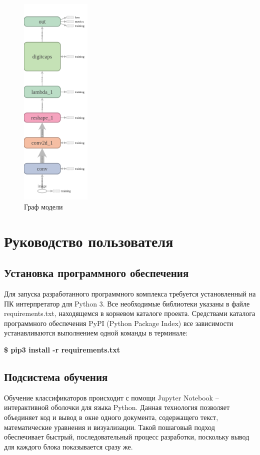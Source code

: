 \begin{figure}[!h]
	\centering
	\includegraphics[width=0.3\textwidth]{inc/img/graph}
	\caption{Граф модели}
	\label{impl:graph}
\end{figure}

\section{Руководство пользователя}

\subsection*{Установка программного обеспечения}

Для запуска разработанного программного комплекса требуется установленный на ПК интерпретатор для Python 3. Все необходимые библиотеки указаны в файле requirements.txt, находящемся в корневом каталоге проекта. Средствами каталога программного обеспечения PyPI (Python Package Index) все зависимости устанавливаются выполнением одной команды в терминале:

\textbf{\$ pip3 install -r requirements.txt}

\subsection*{Подсистема обучения}

Обучение классификаторов происходит с помощи Jupyter Notebook -- интерактивной оболочки для языка Python. Данная технология позволяет объединяет код и вывод в окне одного документа, содержащего текст, математические уравнения и визуализации. Такой пошаговый подход обеспечивает быстрый, последовательный процесс разработки, поскольку вывод для каждого блока показывается сразу же.

